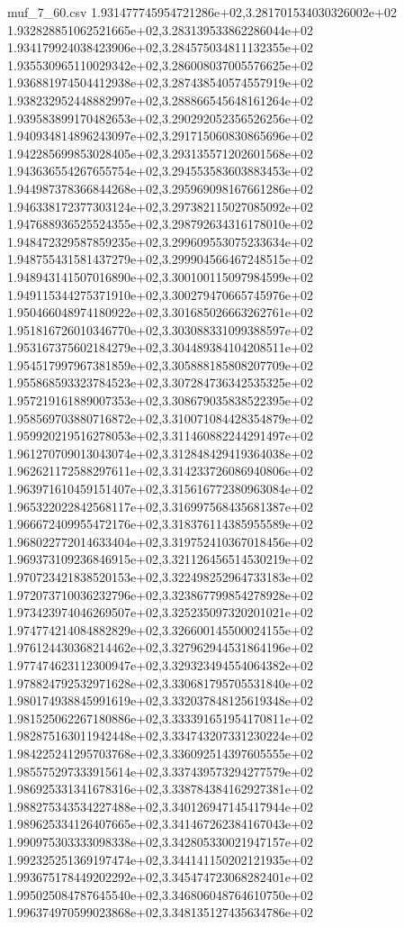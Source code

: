\begin{filecontents*}{muf_7_60.csv}
1.931477745954721286e+02,3.281701534030326002e+02
1.932828851062521665e+02,3.283139533862286044e+02
1.934179924038423906e+02,3.284575034811132355e+02
1.935530965110029342e+02,3.286008037005576625e+02
1.936881974504412938e+02,3.287438540574557919e+02
1.938232952448882997e+02,3.288866545648161264e+02
1.939583899170482653e+02,3.290292052356526256e+02
1.940934814896243097e+02,3.291715060830865696e+02
1.942285699853028405e+02,3.293135571202601568e+02
1.943636554267655754e+02,3.294553583603883453e+02
1.944987378366844268e+02,3.295969098167661286e+02
1.946338172377303124e+02,3.297382115027085092e+02
1.947688936525524355e+02,3.298792634316178010e+02
1.948472329587859235e+02,3.299609553075233634e+02
1.948755431581437279e+02,3.299904566467248515e+02
1.948943141507016890e+02,3.300100115097984599e+02
1.949115344275371910e+02,3.300279470665745976e+02
1.950466048974180922e+02,3.301685026663262761e+02
1.951816726010346770e+02,3.303088331099388597e+02
1.953167375602184279e+02,3.304489384104208511e+02
1.954517997967381859e+02,3.305888185808207709e+02
1.955868593323784523e+02,3.307284736342535325e+02
1.957219161889007353e+02,3.308679035838522395e+02
1.958569703880716872e+02,3.310071084428354879e+02
1.959920219516278053e+02,3.311460882244291497e+02
1.961270709013043074e+02,3.312848429419364038e+02
1.962621172588297611e+02,3.314233726086940806e+02
1.963971610459151407e+02,3.315616772380963084e+02
1.965322022842568117e+02,3.316997568435681387e+02
1.966672409955472176e+02,3.318376114385955589e+02
1.968022772014633404e+02,3.319752410367018456e+02
1.969373109236846915e+02,3.321126456514530219e+02
1.970723421838520153e+02,3.322498252964733183e+02
1.972073710036232796e+02,3.323867799854278928e+02
1.973423974046269507e+02,3.325235097320201021e+02
1.974774214084882829e+02,3.326600145500024155e+02
1.976124430368214462e+02,3.327962944531864196e+02
1.977474623112300947e+02,3.329323494554064382e+02
1.978824792532971628e+02,3.330681795705531840e+02
1.980174938845991619e+02,3.332037848125619348e+02
1.981525062267180886e+02,3.333391651954170811e+02
1.982875163011942448e+02,3.334743207331230224e+02
1.984225241295703768e+02,3.336092514397605555e+02
1.985575297333915614e+02,3.337439573294277579e+02
1.986925331341678316e+02,3.338784384162927381e+02
1.988275343534227488e+02,3.340126947145417944e+02
1.989625334126407665e+02,3.341467262384167043e+02
1.990975303333098338e+02,3.342805330021947157e+02
1.992325251369197474e+02,3.344141150202121935e+02
1.993675178449202292e+02,3.345474723068282401e+02
1.995025084787645540e+02,3.346806048764610750e+02
1.996374970599023868e+02,3.348135127435634786e+02

\end{filecontents*}
